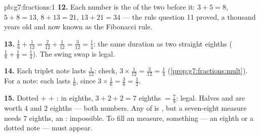 \begin{solution}{pb:g7:fractions:1}
\textbf{12.} Each number is the  of the two before it:
$3 + 5 = 8$, $5 + 8 = 13$, $8 + 13 = 21$, $13 + 21 = 34$ ---
the rule question 11 proved, a thousand years old and now known
as the Fibonacci rule.

\textbf{13.} $\frac16 + \frac{1}{12} = \frac{2}{12} +
\frac{1}{12} = \frac{3}{12} = \frac14$: the same duration as
two straight eighths ($\frac18 + \frac18 = \frac14$). The swing
swap is legal.

\textbf{14.} Each triplet note lasts $\frac{1}{12}$: check,
$3 \times \frac{1}{12} = \frac{3}{12} = \frac14$
(\cref{prop:g7:fractions:mult}). For a  note: each lasts
$\frac16$, since $3 \times \frac16 = \frac36 = \frac12$.

\textbf{15.} Dotted  $+$  $+$ : in eighths,
$3 + 2 + 2 = 7$ eighths $= \frac78$: legal. Halves and 
are worth $4$ and $2$ eighths --- both \emph{} numbers. Any
 of  is , but a seven-eight measure needs
$7$ eighths, an : impossible. To fill an  measure,
something  --- an eighth or a dotted note --- must appear.
\end{solution}

